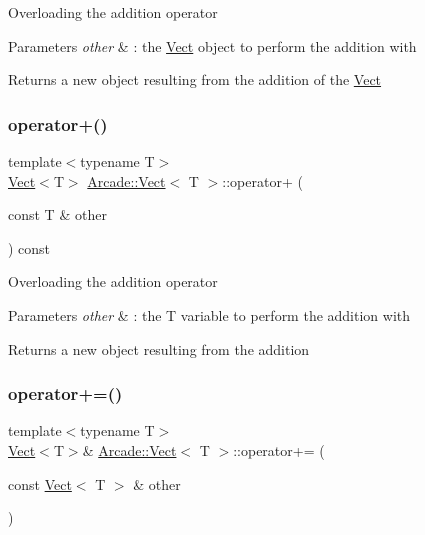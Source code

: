 Overloading the addition operator 
\begin{DoxyParams}{Parameters}
{\em other} & \+: the \hyperlink{class_arcade_1_1_vect}{Vect} object to perform the addition with \\
\hline
\end{DoxyParams}
\begin{DoxyReturn}{Returns}
a new object resulting from the addition of the \hyperlink{class_arcade_1_1_vect}{Vect} 
\end{DoxyReturn}
\mbox{\label{class_arcade_1_1_vect_ac03e7d5e4be634948b7a18541d8131ab}} 
\subsubsection{\texorpdfstring{operator+()}{operator+()}\hspace{0.1cm}{\footnotesize\ttfamily [2/2]}}
{\footnotesize\ttfamily template$<$typename T$>$ \\
\hyperlink{class_arcade_1_1_vect}{Vect}$<$T$>$ \hyperlink{class_arcade_1_1_vect}{Arcade\+::\+Vect}$<$ T $>$\+::operator+ (\begin{DoxyParamCaption}\item[{const T \&}]{other }\end{DoxyParamCaption}) const\hspace{0.3cm}{\ttfamily [inline]}}

Overloading the addition operator 
\begin{DoxyParams}{Parameters}
{\em other} & \+: the T variable to perform the addition with \\
\hline
\end{DoxyParams}
\begin{DoxyReturn}{Returns}
a new object resulting from the addition 
\end{DoxyReturn}
\mbox{\label{class_arcade_1_1_vect_a6ac5816789a378675e9d568327649e21}} 
\subsubsection{\texorpdfstring{operator+=()}{operator+=()}\hspace{0.1cm}{\footnotesize\ttfamily [1/2]}}
{\footnotesize\ttfamily template$<$typename T$>$ \\
\hyperlink{class_arcade_1_1_vect}{Vect}$<$T$>$\& \hyperlink{class_arcade_1_1_vect}{Arcade\+::\+Vect}$<$ T $>$\+::operator+= (\begin{DoxyParamCaption}\item[{const \hyperlink{class_arcade_1_1_vect}{Vect}$<$ T $>$ \&}]{other }\end{DoxyParamCaption})\hspace{0.3cm}{\ttfamily [inline]}}

